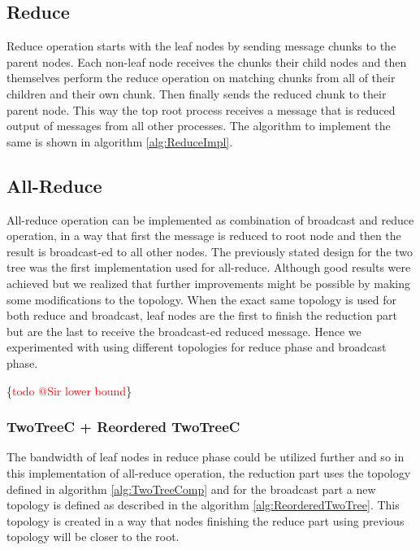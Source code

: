 \documentclass[sigplan,review,anonymous]{acmart}\settopmatter{printfolios=true,printccs=false,printacmref=false}
\begin{document}
\subsection{Reduce}
Reduce operation starts with the leaf nodes by sending message chunks to the parent nodes. Each non-leaf node receives the chunks their child nodes and then themselves perform the reduce operation on matching chunks from all of their children and their own chunk. Then finally sends the reduced chunk to their parent node. This way the top root process receives a message that is reduced output of messages from all other processes. The algorithm to implement the same is shown in algorithm \ref{alg:ReduceImpl}.

\subsection{All-Reduce}
All-reduce operation can be implemented as combination of broadcast and reduce operation, in a way that first the message is reduced to root node and then the result is broadcast-ed to all other nodes. The previously stated design for the two tree was the first implementation used for all-reduce. Although good results were achieved but we realized that further improvements might be possible by making some modifications to the topology. When the exact same topology is used for both reduce and broadcast, leaf nodes are the first to finish the reduction part but are the last to receive the broadcast-ed reduced message. Hence we experimented with using different topologies for reduce phase and broadcast phase.

\ifcmts \{\textcolor{red}{todo @Sir lower bound}\}

\subsubsection{TwoTreeC + Reordered TwoTreeC}
The bandwidth of leaf nodes in reduce phase could be utilized further and so in this implementation of all-reduce operation, the reduction part uses the topology defined in algorithm \ref{alg:TwoTreeComp} and for the broadcast part a new topology is defined as described in the algorithm \ref{alg:ReorderedTwoTree}. This topology is created in a way that nodes finishing the reduce part using previous topology will be closer to the root.\\
\end{document}
